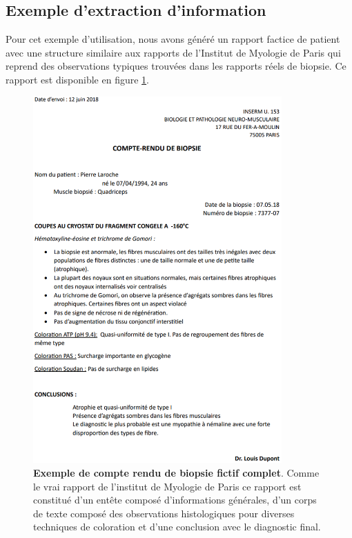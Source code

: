 \subsection{Exemple d'extraction d'information}
Pour cet exemple d'utilisation, nous avons généré un rapport factice de patient avec une structure similaire aux rapports de l'Institut de Myologie de Paris qui reprend des observations typiques trouvées dans les rapports réels de biopsie. Ce rapport est disponible en figure \ref{fig:factice_report}. 
\begin{figure}[H]
 \centering
 \includegraphics[width=0.85\textwidth]{figures/pdf_biopsie.png}
 \caption[Compte rendu de biopsie fictif]{\textbf{Exemple de compte rendu de biopsie fictif complet}. Comme le vrai rapport de l'institut de Myologie de Paris ce rapport est constitué d'un entête composé d'informations générales, d'un corps de texte composé des observations histologiques pour diverses techniques de coloration et d'une conclusion avec le diagnostic final.}
 \label{fig:factice_report}
\end{figure}

